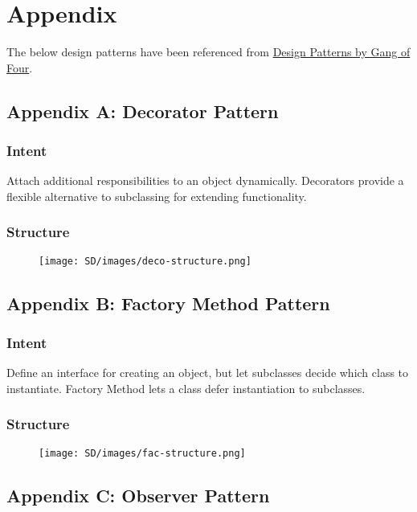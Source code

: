 \documentclass{report}
\begin{document}
\chapter{Appendix}
The below design patterns have been referenced from \href{https://www.amazon.com/gp/product/0201633612/ref=as_li_tl?ie=UTF8&camp=1789&creative=390957&creativeASIN=0201633612&linkCode=as2&tag=triatcraft-20&linkId=XRGUDJCGWC6AJNZM}{Design Patterns by Gang of Four}.
\section{Appendix A: Decorator Pattern}\label{Appendix A}
\subsection{Intent}
Attach additional responsibilities to an object dynamically. Decorators provide a flexible alternative to subclassing for extending functionality.
\subsection{Structure}
\begin{figure}[htp]
\begin{center}
    \texttt{[image: SD/images/deco-structure.png]}
\end{center}
\end{figure}
\pagebreak
\section{Appendix B: Factory Method Pattern}\label{Appendix B}
\subsection{Intent}
Define an interface for creating an object, but let subclasses decide which class to instantiate. Factory Method lets a class defer instantiation to subclasses.
\subsection{Structure}
\begin{figure}[htp]
\begin{center}
    \texttt{[image: SD/images/fac-structure.png]}
\end{center}
\end{figure}
\section{Appendix C: Observer Pattern}\label{Appendix C}
\end{document}
